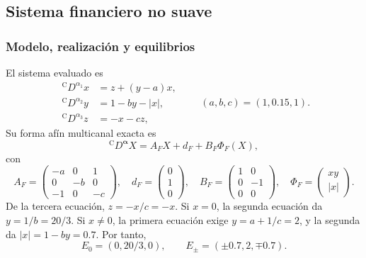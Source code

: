 \subsection{Sistema financiero no suave}

\subsubsection*{Modelo, realización y equilibrios}

El sistema evaluado es
\begin{equation}
\begin{aligned}
 {}^{\mathrm C}D^{\alpha_1}x&=z+(y-a)x,\\
 {}^{\mathrm C}D^{\alpha_2}y&=1-by-|x|,\\
 {}^{\mathrm C}D^{\alpha_3}z&=-x-cz,
\end{aligned}
\qquad (a,b,c)=(1,0.15,1).
\label{ncbench:eq:financial}
\end{equation}
Su forma afín multicanal exacta es
\begin{equation}
 {}^{\mathrm C}D^{\boldsymbol\alpha}X=A_FX+d_F+B_F\Phi_F(X),
\end{equation}
con
\begin{equation}
 A_F=\begin{pmatrix}-a&0&1\\0&-b&0\\-1&0&-c\end{pmatrix},\quad
 d_F=\begin{pmatrix}0\\1\\0\end{pmatrix},\quad
 B_F=\begin{pmatrix}1&0\\0&-1\\0&0\end{pmatrix},\quad
 \Phi_F=\begin{pmatrix}xy\\|x|\end{pmatrix}.
\end{equation}
De la tercera ecuación, \(z=-x/c=-x\). Si \(x=0\), la segunda ecuación da
\(y=1/b=20/3\). Si \(x\ne0\), la primera ecuación exige \(y=a+1/c=2\), y la
segunda da \(|x|=1-by=0.7\). Por tanto,
\begin{equation}
 E_0=(0,20/3,0),\qquad E_{\pm}=(\pm0.7,2,\mp0.7).
\end{equation}

